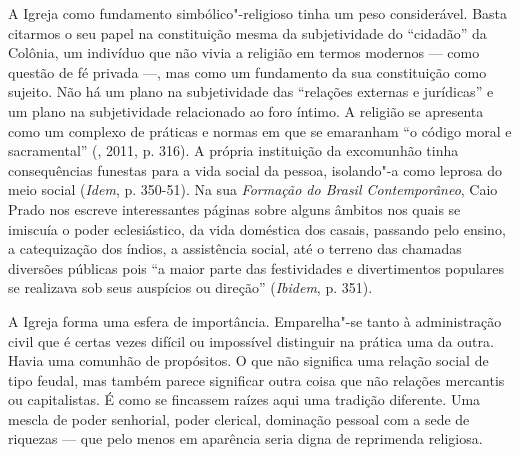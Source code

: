 A Igreja como fundamento simbólico"-religioso tinha um peso considerável.
Basta citarmos o seu papel na constituição mesma da subjetividade do
``cidadão'' da Colônia, um indivíduo que não vivia a religião em termos
modernos --- como questão de fé privada ---, mas como um fundamento da sua
constituição como sujeito. Não há um plano na subjetividade das
``relações externas e jurídicas'' e um plano na subjetividade
relacionado ao foro íntimo. A religião se apresenta como um complexo de
práticas e normas em que se emaranham ``o código moral e sacramental''
(, 2011, p. 316). A própria instituição da excomunhão tinha
consequências funestas para a vida social da pessoa, isolando"-a como
leprosa do meio social (\emph{Idem}, p. 350-51). Na sua \emph{Formação
do Brasil Contemporâneo}, Caio Prado nos escreve interessantes páginas
sobre alguns âmbitos nos quais se imiscuía o poder eclesiástico, da vida
doméstica dos casais, passando pelo ensino, a catequização dos índios, a
assistência social, até o terreno das chamadas diversões públicas pois
``a maior parte das festividades e divertimentos populares se realizava
sob seus auspícios ou direção'' (\emph{Ibidem}, p. 351).

A Igreja forma uma esfera de importância. Emparelha"-se tanto à
administração civil que é certas vezes difícil ou impossível distinguir
na prática uma da outra. Havia uma comunhão de propósitos. O que não
significa uma relação social de tipo feudal, mas também parece
significar outra coisa que não relações mercantis ou capitalistas. É
como se fincassem raízes aqui uma tradição diferente. Uma mescla de
poder senhorial, poder clerical, dominação pessoal com a sede de
riquezas --- que pelo menos em aparência seria digna de reprimenda
religiosa.


